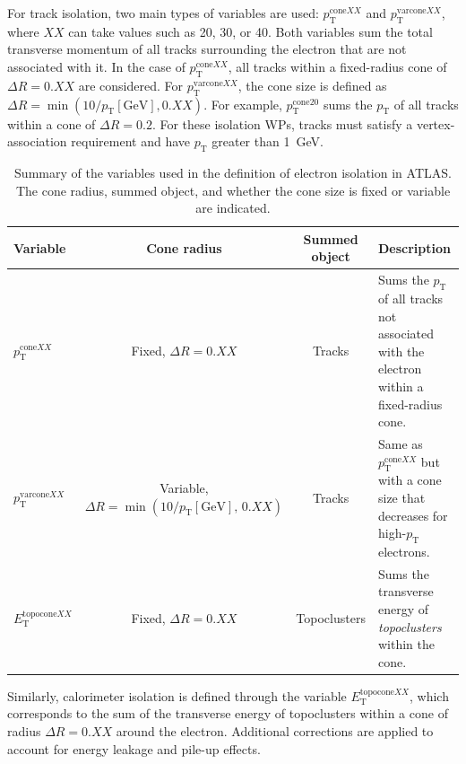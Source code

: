 For track isolation, two main types of variables are used: $p_{\mathrm{T}}^{\mathrm{cone}XX}$ and $p_{\mathrm{T}}^{\mathrm{varcone}XX}$, where $XX$ can take values such as 20, 30, or 40. Both variables sum the total transverse momentum of all tracks surrounding the electron that are not associated with it. In the case of $p_{\mathrm{T}}^{\mathrm{cone}XX}$, all tracks within a fixed-radius cone of $\Delta R = 0.XX$ are considered. For $p_{\mathrm{T}}^{\mathrm{varcone}XX}$, the cone size is defined as $\Delta R = \min(10/p_{\mathrm{T}}[\text{GeV}], 0.XX)$. For example, $p_{\mathrm{T}}^{\mathrm{cone20}}$ sums the $p_{\mathrm{T}}$ of all tracks within a cone of $\Delta R = 0.2$. For these isolation WPs, tracks must satisfy a vertex-association requirement and have $p_{\mathrm{T}}$ greater than 1~GeV.

\begin{table}[htbp]
  \scriptsize
  \centering
  \caption{Summary of the variables used in the definition of electron isolation in ATLAS. The cone radius, summed object, and whether the cone size is fixed or variable are indicated.}
  \renewcommand{\arraystretch}{1.2} %
  \begin{tabular}{lccp{3cm}}
  \hline
  \textbf{Variable} & \textbf{Cone radius} & \textbf{Summed object} & \textbf{Description} \\
  \hline
  $p_{\mathrm{T}}^{\mathrm{cone}XX}$ & Fixed, $\Delta R = 0.XX$ & Tracks & Sums the $p_{\mathrm{T}}$ of all tracks not associated with the electron within a fixed-radius cone. \\
  $p_{\mathrm{T}}^{\mathrm{varcone}XX}$ & Variable, $\Delta R = \min(10/p_{\mathrm{T}}[\text{GeV}],\,0.XX)$ & Tracks & Same as $p_{\mathrm{T}}^{\mathrm{cone}XX}$ but with a cone size that decreases for high-$p_{\mathrm{T}}$ electrons. \\
  $E_{\mathrm{T}}^{\mathrm{topocone}XX}$ & Fixed, $\Delta R = 0.XX$ & Topoclusters & Sums the transverse energy of \textit{topoclusters} within the cone. \\
  \hline
  \end{tabular}
  \label{tab:electron_isolation_vars}
  \end{table}

Similarly, calorimeter isolation is defined through the variable $E_{\mathrm{T}}^{\mathrm{topocone}XX}$, which corresponds to the sum of the transverse energy of topoclusters within a cone of radius $\Delta R = 0.XX$ around the electron. Additional corrections are applied to account for energy leakage and pile-up effects.
